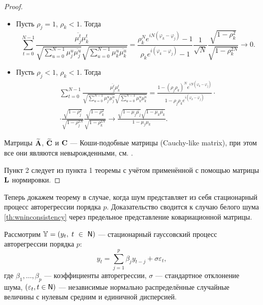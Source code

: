 \documentclass[12pt,a4paper]{article}
\begin{document}
\begin{proof}
\begin{itemize}
			\item Пусть $\rho_j = 1$, $\rho_k < 1$. Тогда
			\begin{equation*}
			\sum_{t=0}^{N-1} \frac{\overline{\mu_j^t} \mu_k^t}{\sqrt{\sum_{u=0}^{N-1} \mu_j^u \overline{\mu_j^u}} \sqrt{\sum_{u=0}^{N-1} \mu_k^u \overline{\mu_k^u}}} = \frac{\rho_k^N e^{i N (\varphi_k -\varphi_j)} - 1}{\rho_k e^{i (\varphi_k - \varphi_j)} - 1}  \frac{1}{\sqrt{N}} \frac{\sqrt{1 - \rho_k^2}}{\sqrt{1 - \rho_k^{2N}}} \to 0.
			\end{equation*}
			
			\item Пусть $\rho_j < 1$, $\rho_k < 1$. Тогда
			\begin{multline*}
			\sum_{t=0}^{N-1} \frac{\overline{\mu_j^t} \mu_k^t}{\sqrt{\sum_{u=0}^{N-1} \mu_j^u \overline{\mu_j^u}} \sqrt{\sum_{u=0}^{N-1} \mu_k^u \overline{\mu_k^u}}} = \frac{1 - (\rho_j \rho_k)^N e^{i N (\varphi_k -\varphi_j)}}{1 - \rho_j \rho_k e^{i (\varphi_k - \varphi_j)}} \cdot \\ \cdot \frac{\sqrt{1 - \rho_j^2}}{\sqrt{1 - \rho_j^{2N}}} \frac{\sqrt{1 - \rho_k^2}}{\sqrt{1 - \rho_k^{2N}}} \to \frac{\sqrt{1 - \mu_{j} \overline{\mu_{j}}}\sqrt{1 - \mu_{k} \overline{\mu_{k}}}}{1 - \overline{\mu_{j}} \mu_{k}}.
			\end{multline*}
				
		\end{itemize}
		
		Матрицы $\widetilde {\mathbf{A}}$, $\widetilde {\mathbf{C}}$ и $\mathbf{C}$ --- Коши-подобные матрицы (Cauchy-like matrix), при этом все они являются невырожденными, см. \cite{Schechter1959}.
		
		Пункт 2 следует из пункта 1 теоремы с учётом применённой с помощью матрицы $\mathbf{L}$ нормировки.
	\end{proof}

Теперь докажем теорему в случае, когда шум представляет из себя стационарный процесс авторегрессии порядка $p$. Доказательство сводится к случаю белого шума \ref{th:wninconsistency} через предельное представление ковариационной матрицы.

Рассмотрим $\mathbb{Y} = (y_t, \; t~\in~\mathsf{N})$ --- стационарный гауссовский процесс авторегрессии  порядка $p$:
\begin{equation} \label{def:arp}
y_t = \sum_{j = 1}^p \beta_j y_{t - j} + \sigma \varepsilon_t,
\end{equation}
где $\beta_1, \ldots, \beta_p$ --- коэффициенты авторегрессии, $\sigma$ --- стандартное отклонение шума, $(\varepsilon_t, t \in \mathsf{N})$ --- независимые нормально распределённые случайные величины с нулевым средним и единичной дисперсией.
\end{document}

